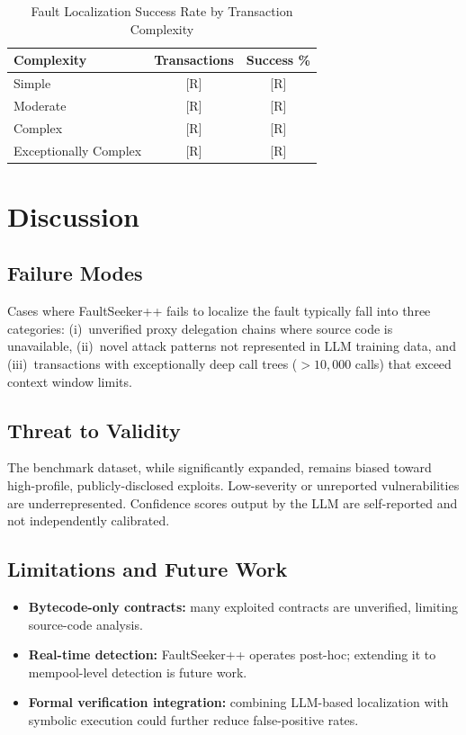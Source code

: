 \documentclass[conference]{IEEEtran}
\begin{document}
\begin{table}[h]
\centering
\caption{Fault Localization Success Rate by Transaction Complexity}
\label{tab:complexity}
\begin{tabular}{lcc}
\toprule
\textbf{Complexity} & \textbf{Transactions} & \textbf{Success \%} \\
\midrule
Simple                & [R] & [R] \\
Moderate              & [R] & [R] \\
Complex               & [R] & [R] \\
Exceptionally Complex & [R] & [R] \\
\bottomrule
\end{tabular}
\end{table}


\section{Discussion}
\label{sec:discussion}

\subsection{Failure Modes}
Cases where FaultSeeker++ fails to localize the fault typically fall
into three categories:
(i)~unverified proxy delegation chains where source code is unavailable,
(ii)~novel attack patterns not represented in LLM training data, and
(iii)~transactions with exceptionally deep call trees
($> 10{,}000$ calls) that exceed context window limits.

\subsection{Threat to Validity}
The benchmark dataset, while significantly expanded, remains biased
toward high-profile, publicly-disclosed exploits.
Low-severity or unreported vulnerabilities are underrepresented.
Confidence scores output by the LLM are self-reported and not
independently calibrated.

\subsection{Limitations and Future Work}
\begin{itemize}
  \item \textbf{Bytecode-only contracts:} many exploited contracts are
        unverified, limiting source-code analysis.
  \item \textbf{Real-time detection:} FaultSeeker++ operates
        post-hoc; extending it to mempool-level detection is future work.
  \item \textbf{Formal verification integration:} combining LLM-based
        localization with symbolic execution could further reduce
        false-positive rates.
\end{itemize}
\end{document}

